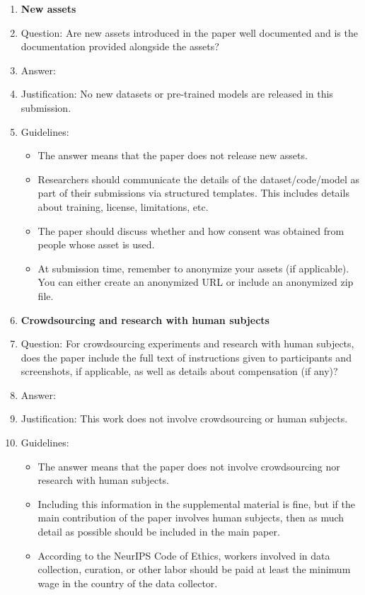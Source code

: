 \documentclass{article}
\begin{document}
\begin{enumerate}
\item {\bf New assets}
    \item[] Question: Are new assets introduced in the paper well documented and is the documentation provided alongside the assets?
    \item[] Answer: \answerNA{}
    \item[] Justification: No new datasets or pre-trained models are released in this submission.
    \item[] Guidelines:
    \begin{itemize}
        \item The answer \answerNA{} means that the paper does not release new assets.
        \item Researchers should communicate the details of the dataset\slash code\slash model as part of their submissions via structured templates. This includes details about training, license, limitations, etc. 
        \item The paper should discuss whether and how consent was obtained from people whose asset is used.
        \item At submission time, remember to anonymize your assets (if applicable). You can either create an anonymized URL or include an anonymized zip file.
    \end{itemize}

\item {\bf Crowdsourcing and research with human subjects}
    \item[] Question: For crowdsourcing experiments and research with human subjects, does the paper include the full text of instructions given to participants and screenshots, if applicable, as well as details about compensation (if any)? 
    \item[] Answer: \answerNA{}
    \item[] Justification: This work does not involve crowdsourcing or human subjects.
    \item[] Guidelines:
    \begin{itemize}
        \item The answer \answerNA{} means that the paper does not involve crowdsourcing nor research with human subjects.
        \item Including this information in the supplemental material is fine, but if the main contribution of the paper involves human subjects, then as much detail as possible should be included in the main paper. 
        \item According to the NeurIPS Code of Ethics, workers involved in data collection, curation, or other labor should be paid at least the minimum wage in the country of the data collector. 
    \end{itemize}


\end{enumerate}
\end{document}
